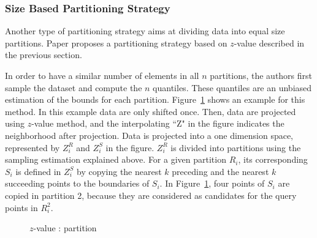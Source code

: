 \documentclass[10pt,journal,compsoc]{IEEEtran}
\begin{document}
\subsubsection{Size Based Partitioning Strategy} 

Another type of partitioning strategy aims at dividing data into equal size partitions. Paper \cite{Zhang:2012:EPK:2247596.2247602} proposes a partitioning strategy based on $z$-value described in the 
previous section. 

In order to have a similar number of elements in all $n$ partitions, the authors first sample the dataset and compute the $n$ quantiles. These quantiles are an  unbiased estimation of the bounds for each partition. Figure~\ref{projection_partition_figure} shows an example for this method. In this example data are only shifted once. Then, data are projected using $z$-value method, and the interpolating ``Z" in the figure indicates the neighborhood after projection. Data is projected into a one dimension space, represented by 
$Z_{i}^{R}$ and $Z_{i}^{S}$ in the figure. $Z_{i}^{R}$ is divided into partitions using the sampling estimation explained above. For a given partition $R_i$, its corresponding $S_i$ is defined in $Z_{i}^{S}$ by copying the nearest $k$ preceding and the nearest $k$ succeeding points to the boundaries of $S_i$.
In  Figure~\ref{projection_partition_figure}, four points of $S_i$ are copied in partition 2, because they are considered as candidates for the query points in $R_i^2$.

 
\begin{figure}[h]
\centering
{}
\caption{$z$-value : partition \label{projection_partition_figure}}
\end{figure}
\end{document}
